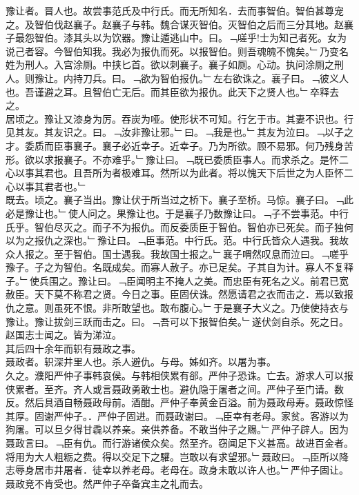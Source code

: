 \documentclass{zhvt-classic}
\begin{document}
\hspace*{2em}豫让者。晋人也。故尝事范氏及中行氏。而无所知名．去而事智伯。智伯甚尊宠之。及智伯伐赵襄子。赵襄子与韩。魏合谋灭智伯。灭智伯之后而三分其地。赵襄子最怨智伯。漆其头以为饮器。豫让遁逃山中。曰。﹁嗟乎!士为知己者死。女为说己者容。今智伯知我。我必为报仇而死。以报智伯。则吾魂魄不愧矣。﹂乃变名姓为刑人。入宫涂厕。中挟匕首。欲以刺襄子。襄子如厕。心动。执问涂厕之刑人。则豫让。内持刀兵。曰。﹁欲为智伯报仇。﹂左右欲诛之。襄子曰。﹁彼义人也。吾谨避之耳。且智伯亡无后。而其臣欲为报仇。此天下之贤人也。﹂卒释去之。\\
\hspace*{2em}居顷之。豫让又漆身为厉。吞炭为哑。使形状不可知。行乞于市。其妻不识也。行见其友。其友识之。曰。﹁汝非豫让邪。﹂曰。﹁我是也。﹂其友为泣曰。﹁以子之才。委质而臣事襄子。襄子必近幸子。近幸子。乃为所欲。顾不易邪。何乃残身苦形。欲以求报襄子。不亦难乎。﹂豫让曰。﹁既已委质臣事人。而求杀之。是怀二心以事其君也。且吾所为者极难耳。然所以为此者。将以愧天下后世之为人臣怀二心以事其君者也。﹂\\
\hspace*{2em}既去。顷之。襄子当出。豫让伏于所当过之桥下。襄子至桥。马惊。襄子曰。﹁此必是豫让也。﹂使人问之。果豫让也。于是襄子乃数豫让曰。﹁子不尝事范。中行氏乎。智伯尽灭之。而子不为报仇。而反委质臣于智伯。智伯亦已死矣。而子独何以为之报仇之深也。﹂豫让曰。﹁臣事范。中行氏。范。中行氏皆众人遇我。我故众人报之。至于智伯。国士遇我。我故国士报之。﹂襄子喟然叹息而泣曰。﹁嗟乎豫子。子之为智伯。名既成矣。而寡人赦子。亦已足矣。子其自为计。寡人不复释子。﹂使兵围之。豫让曰。﹁臣闻明主不掩人之美。而忠臣有死名之义。前君已宽赦臣。天下莫不称君之贤。今日之事。臣固伏诛。然愿请君之衣而击之．焉以致报仇之意。则虽死不恨。非所敢望也。敢布腹心。﹂于是襄子大义之。乃使使持衣与豫让。豫让拔剑三跃而击之。曰。﹁吾可以下报智伯矣。﹂遂伏剑自杀。死之日。赵国志士闻之。皆为涕泣。\\
\hspace*{2em}其后四十余年而轵有聂政之事。\\
\hspace*{2em}聂政者。轵深井里人也。杀人避仇。与母。姊如齐。以屠为事。\\
\hspace*{2em}久之。濮阳严仲子事韩哀侯。与韩相侠累有郤。严仲子恐诛。亡去。游求人可以报侠累者。至齐。齐人或言聂政勇敢士也。避仇隐于屠者之间。严仲子至门请。数反。然后具酒自畅聂政母前。酒酣。严仲子奉黄金百溢。前为聂政母寿。聂政惊怪其厚。固谢严仲子。．严仲子固进。而聂政谢曰。﹁臣幸有老母。家贫。客游以为狗屠。可以旦夕得甘毳以养亲。亲供养备。不敢当仲子之赐。﹂严仲子辟人。因为聂政言曰。﹁臣有仇。而行游诸侯众矣。然至齐。窃闻足下义甚高。故进百金者。将用为大人粗粝之费。得以交足下之驩。岂敢以有求望邪。﹂聂政曰。﹁臣所以降志辱身居市井屠者．徒幸以养老母。老母在。政身未敢以许人也。﹂严仲子固让。聂政竞不肯受也。然严仲子卒备宾主之礼而去。\\
\end{document}
